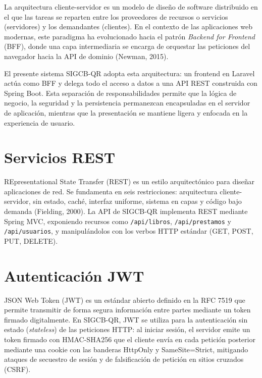 \documentclass[
11pt,
a4paper,
]{report}
\begin{document}
	La arquitectura cliente-servidor es un modelo de diseño de software distribuido en el que las tareas se reparten entre los proveedores de recursos o servicios (servidores) y los demandantes (clientes). En el contexto de las aplicaciones web modernas, este paradigma ha evolucionado hacia el patrón \emph{Backend for Frontend} (BFF), donde una capa intermediaria se encarga de orquestar las peticiones del navegador hacia la API de dominio (Newman, 2015).
	
	El presente sistema SIGCB-QR adopta esta arquitectura: un frontend en Laravel actúa como BFF y delega todo el acceso a datos a una API REST construida con Spring Boot. Esta separación de responsabilidades permite que la lógica de negocio, la seguridad y la persistencia permanezcan encapsuladas en el servidor de aplicación, mientras que la presentación se mantiene ligera y enfocada en la experiencia de usuario.
	
	\hypertarget{servicios-rest}{%
		\section{Servicios REST}\label{servicios-rest}}
	
	REpresentational State Transfer (REST) es un estilo arquitectónico para diseñar aplicaciones de red. Se fundamenta en seis restricciones: arquitectura cliente-servidor, sin estado, caché, interfaz uniforme, sistema en capas y código bajo demanda (Fielding, 2000). La API de SIGCB-QR implementa REST mediante Spring MVC, exponiendo recursos como \texttt{/api/libros}, \texttt{/api/prestamos} y \texttt{/api/usuarios}, y manipulándolos con los verbos HTTP estándar (GET, POST, PUT, DELETE).
	
	\hypertarget{autenticacion-jwt}{%
		\section{Autenticación JWT}\label{autenticacion-jwt}}
	
	JSON Web Token (JWT) es un estándar abierto definido en la RFC 7519 que permite transmitir de forma segura información entre partes mediante un token firmado digitalmente. En SIGCB-QR, JWT se utiliza para la autenticación sin estado (\emph{stateless}) de las peticiones HTTP: al iniciar sesión, el servidor emite un token firmado con HMAC-SHA256 que el cliente envía en cada petición posterior mediante una cookie con las banderas HttpOnly y SameSite=Strict, mitigando ataques de secuestro de sesión y de falsificación de petición en sitios cruzados (CSRF).
	
\end{document}
